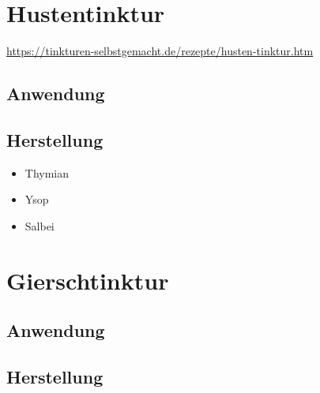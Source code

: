 


\newpage



\section{Hustentinktur}


\cite{tinkturen}  

\url{https://tinkturen-selbstgemacht.de/rezepte/husten-tinktur.htm} 

 

\subsection{Anwendung}
\subsection{Herstellung}
\begin{itemize}
	\item Thymian
	\item Ysop
	\item Salbei
\end{itemize}




\newpage



\section{Gierschtinktur}


    

\subsection{Anwendung}
\subsection{Herstellung}

